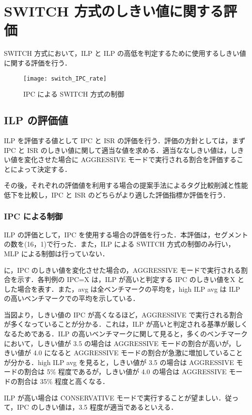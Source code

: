 \section{SWITCH 方式のしきい値に関する評価}
\label{sec:eval_threshold}
SWITCH 方式において，ILP と ILP の高低を判定するために使用するしきい値に関する評価を行う．

\begin{figure}[htb]
  \centering
  \texttt{[image: switch\_IPC\_rate]}
  \caption{IPC による SWITCH 方式の制御}
  \label{fig:switch_IPC_rate}
\end{figure}

\subsection{ILP の評価値}
ILP を評価する値として IPC と ISR の評価を行う．評価の方針としては，まず IPC と ISR のしきい値に関して適当な値を求める．適当ななしきい値は，しきい値を変化させた場合に AGGRESSIVE モードで実行される割合を評価することによって決定する．

その後，それぞれの評価値を利用する場合の提案手法によるタグ比較削減と性能低下を比較し，IPC と ISR のどちらがより適した評価指標か評価を行う．

\subsubsection{IPC による制御}
ILP の評価として，IPC を使用する場合の評価を行った．本評価は，セグメントの数を(16，1)で行った．また，ILP による SWITCH 方式の制御のみ行い，MLP による制御は行っていない．

に，IPC のしきい値を変化させた場合の，AGGRESSIVE モードで実行される割合を示す．各判例の IPC=X は，ILP が高いと判定する IPC のしきい値をX とした場合を表す．また，avg は全ベンチマークの平均を，high ILP avg は ILP の高いベンチマークでの平均を示している． 

当図より，しきい値の IPC が高くなるほど，AGGRESSIVE で実行される割合が多くなっていることが分かる．これは，ILP が高いと判定される基準が厳しくなるためである．ILP の高いベンチマークに関して見ると，多くのベンチマークにおいて，しきい値が 3.5 の場合は AGGRESSIVE モードの割合が高いが，しきい値が 4.0 になると AGGRESSIVE モードの割合が急激に増加していることが分かる．high ILP avg を見ると，しきい値が 3.5 の場合は AGGRESSIVE モードの割合は 5\% 程度であるが，しきい値が 4.0 の場合は AGGRESSIVE モードの割合は 35\% 程度と高くなる．

ILP が高い場合は CONSERVATIVE モードで実行することが望ましい．従って，IPC のしきい値は，3.5 程度が適当であるといえる．


